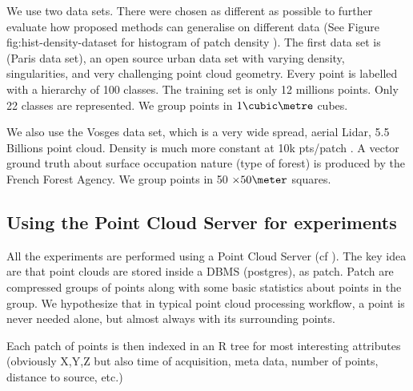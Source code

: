 	
 		We use two data sets. There were chosen as different as possible to further evaluate how proposed methods can generalise on different data (See Figure fig:hist-density-dataset for histogram of patch density ). 
 		The first data set is \cite{IQmulus2014} (Paris data set), an open source urban data set with varying density, singularities, and very challenging point cloud geometry. 
 		Every point is labelled with a hierarchy of 100 classes.
 		The training set is only 12 millions points.
 		Only 22 classes are represented. We group points in $1 \cubic \metre$ cubes.
 		
 		We also use the Vosges data set, which is a very wide spread, aerial Lidar, 5.5 Billions point cloud. 
 		Density is much more constant at 10k pts/patch .
 		A vector ground truth about surface occupation nature (type of forest) is produced by the French Forest Agency.
 		We group points in 50 $\times 50 \meter$ squares.
 		

	\subsection{Using the Point Cloud Server for experiments}
		All the experiments are performed using a Point Cloud Server (cf \cite{Cura2014}).
		The key idea are that point clouds are stored inside a DBMS (postgres), as patch. Patch are compressed groups of points along with some basic statistics about points in the group.
		We hypothesize that in typical point cloud processing workflow, a point is never needed alone, but almost always with its surrounding points.
	
		Each patch of points is then indexed in an R tree for most interesting attributes (obviously X,Y,Z but also time of acquisition, meta data, number of points, distance to source, etc.)
			
